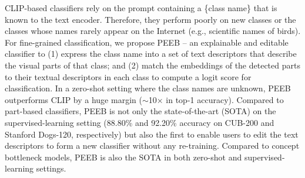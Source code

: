 CLIP-based classifiers rely on the prompt containing a \{class name\} that is known to the text encoder. Therefore, they perform poorly on new classes or the classes whose names rarely appear on the Internet (e.g., scientific names of birds). For fine-grained classification, we propose PEEB – an explainable and editable classifier to (1) express the class name into a set of text descriptors that describe the visual parts of that class; and (2) match the embeddings of the detected parts to their textual descriptors in each class to compute a logit score for classification. In a zero-shot setting where the class names are unknown, PEEB outperforms CLIP by a huge margin ($\sim$10× in top-1 accuracy). Compared to part-based classifiers, PEEB is not only the state-of-the-art (SOTA) on the supervised-learning setting (88.80\% and 92.20\% accuracy on CUB-200 and Stanford Dogs-120, respectively) but also the first to enable users to edit the text descriptors to form a new classifier without any re-training. Compared to concept bottleneck models, PEEB is also the SOTA in both zero-shot and supervised-learning settings.